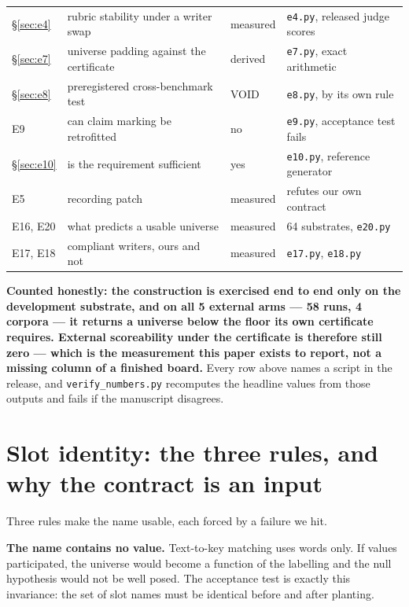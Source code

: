 \documentclass[10pt]{article}
\newcommand{\RM}[1]{{#1}}
\begin{document}
\begin{center}
\begin{tabular}{@{}llll@{}}
\S\ref{sec:e4} & rubric stability under a writer swap & \RM{measured} & \texttt{e4.py}, released judge scores \\
\S\ref{sec:e7} & universe padding against the certificate & \RM{derived} & \texttt{e7.py}, exact arithmetic \\
\S\ref{sec:e8} & preregistered cross-benchmark test & \RM{VOID} & \texttt{e8.py}, by its own rule \\
E9 & can claim marking be retrofitted & \RM{no} & \texttt{e9.py}, acceptance test fails \\
\S\ref{sec:e10} & is the requirement sufficient & \RM{yes} & \texttt{e10.py}, reference generator \\
E5 & recording patch & \RM{measured} & refutes our own contract \\
E16, E20 & what predicts a usable universe & \RM{measured} & 64 substrates, \texttt{e20.py} \\
E17, E18 & compliant writers, ours and not & \RM{measured} & \texttt{e17.py}, \texttt{e18.py} \\
\bottomrule
\end{tabular}
\end{center}

\noindent\textbf{Counted honestly: the construction is exercised end to end only
on the development substrate, and on all \RM{5} external arms --- \RM{58} runs,
\RM{4} corpora --- it returns a universe below the floor its own certificate
requires. External scoreability under the certificate is therefore still
zero --- which is the measurement this paper exists to report, not a missing
column of a finished board.} Every row above names a script in the release, and
\texttt{verify\_numbers.py} recomputes the headline values from those outputs
and fails if the manuscript disagrees.



\section{Slot identity: the three rules, and why the contract is an input}
\label{sec:slots}

Three rules make the name usable, each forced by a failure we hit.

\textbf{The name contains no value.} Text-to-key matching uses words only.
If values participated, the universe would become a function of the labelling
and the null hypothesis would not be well posed. The acceptance test is exactly
this invariance: the set of slot names must be identical before and after
planting.
\end{document}
